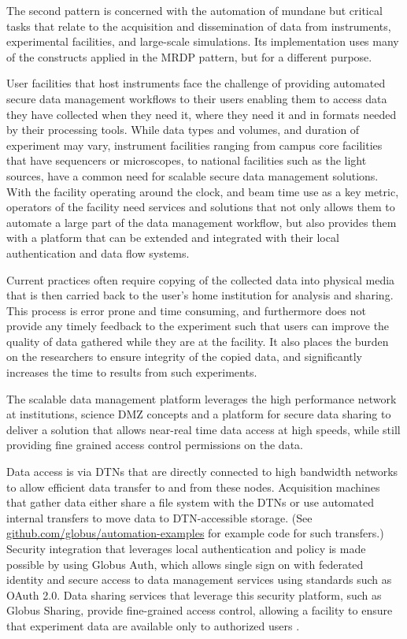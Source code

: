 \documentclass[10pt]{article}
\begin{document}
The second pattern is concerned with 
the automation of mundane but critical tasks that relate to the acquisition 
and dissemination of data from instruments, experimental facilities, and large-scale simulations.
Its implementation uses many of the constructs applied in the MRDP pattern, but for a different purpose. 

User facilities that host instruments face the challenge of providing automated secure data management workflows to their users enabling them to access data they have collected when they need it, where they need it and in formats needed by their processing tools. 
While data types and volumes, and duration of experiment may vary, instrument facilities ranging from campus core facilities that have sequencers or microscopes, to national facilities such as the light sources, have a common need for scalable secure data management solutions. 
With the facility operating around the clock, and beam time use as a key metric, operators of the facility need services and solutions that not only allows them to automate a large part of the data management workflow, but also provides them with a platform that can be extended and integrated with their local authentication and data flow systems.

Current practices often require copying of the collected data into physical media that is then carried back to the user's home institution for analysis and sharing. 
This process is error prone and time consuming, and furthermore does not provide any timely feedback to the experiment such that users can improve the quality of data gathered while they are at the facility. 
It also places the burden on the researchers to ensure integrity of the copied data, 
and significantly increases the time to results from such experiments.

The scalable data management platform leverages the high performance network at institutions, 
science DMZ concepts and a platform for secure data sharing to deliver a solution that allows near-real time data access at high speeds, 
while still providing fine grained access control permissions on the data. 

Data access is via DTNs that are directly connected to high bandwidth networks to allow efficient data transfer to and from these nodes. 
Acquisition machines that gather data either share a file system with the DTNs or use automated internal transfers to move data to DTN-accessible storage.
(See \url{github.com/globus/automation-examples} for example code for such transfers.)
Security integration that leverages local authentication and policy is made possible by using Globus Auth, which allows single sign on with federated identity and secure access to data management services using standards such as OAuth 2.0. 
Data sharing services that leverage this security platform,
such as Globus Sharing,
provide fine-grained access control, 
allowing a facility to ensure that experiment data are available only to authorized users . 
\end{document}
